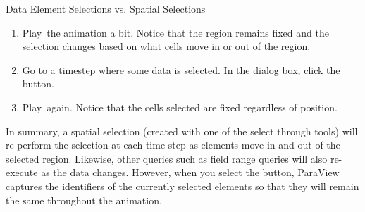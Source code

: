 \begin{exercise}{Data Element Selections vs. Spatial Selections}
\begin{enumerate}
  \item Play~\vcrPlay the animation a bit.  Notice that the region remains
    fixed and the selection changes based on what cells move in or out of
    the region.
  \item Go to a timestep where some data is selected. In the  dialog box, click the  button.
  \item Play~\vcrPlay again.  Notice that the cells selected are fixed
    regardless of position.
  \end{enumerate}

  In summary, a spatial selection (created with one of the select through
  tools) will re-perform the selection at each time step as elements move
  in and out of the selected region.  Likewise, other queries such as field
  range queries will also re-execute as the data changes. However, when you
  select the  button, ParaView captures the
  identifiers of the currently selected elements so that they will remain
  the same throughout the animation.
\end{exercise}




